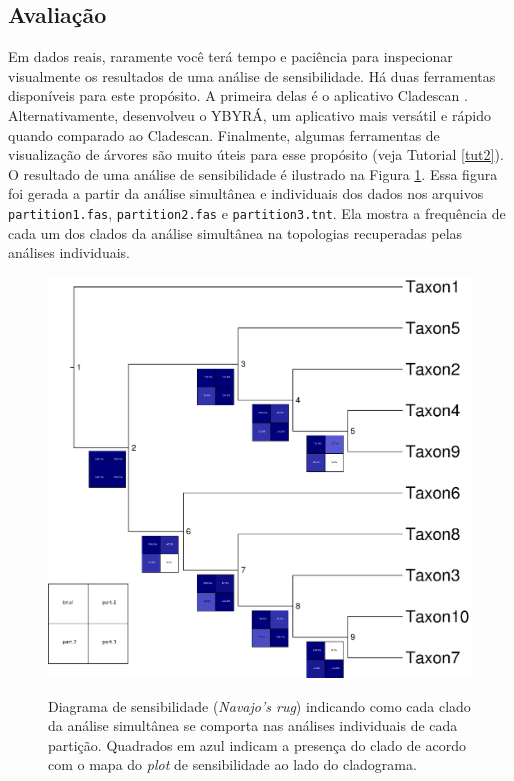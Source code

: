 \begin{refsection}
\subsection{Avaliação}\label{tut10:sa:evaluation}

Em dados reais, raramente você terá tempo e paciência para inspecionar visualmente os resultados de uma análise de sensibilidade. Há duas ferramentas disponíveis para este propósito. A primeira delas é o aplicativo Cladescan \parencite[][; disponível para baixar \href{https://rc.fas.harvard.edu/resources/documentation/software/cladescan/}{aqui}]{Sanders_2010}. Alternativamente, \textcite{Machado_2014} desenvolveu o YBYRÁ, um aplicativo mais versátil e rápido quando comparado ao Cladescan. Finalmente, algumas ferramentas de visualização de árvores \parencite[\textit{e.g.}, FigTree;][]{Rambaut_2006} são muito úteis para esse propósito (veja Tutorial \ref{tut2}). O resultado de uma análise de sensibilidade é ilustrado na Figura \ref{tut10:fig:sens_plot}. Essa figura foi gerada a partir da análise simultânea e individuais dos dados nos arquivos \texttt{partition1.fas}, \texttt{partition2.fas} e \texttt{partition3.tnt}. Ela mostra a frequência de cada um dos clados da análise simultânea na topologias recuperadas pelas análises individuais. 


  \begin{figure}[H]
      {\includegraphics[scale=0.9]{figures/tut10/sens_plot.eps}}
	{\caption[Diagrama de sensibilidade (\textit{Navajo's rug})]{Diagrama de sensibilidade (\textit{Navajo's rug}) indicando como cada clado da análise simultânea se comporta nas análises individuais de cada partição. Quadrados em azul indicam a presença do clado de acordo com o mapa do \textit{plot} de sensibilidade ao lado do cladograma.}\label{tut10:fig:sens_plot}}
  \end{figure}


\end{refsection}
